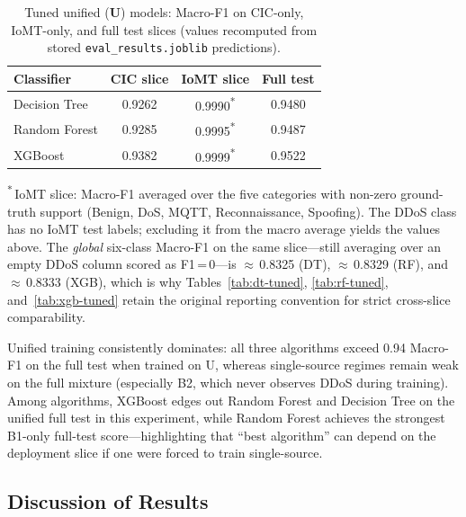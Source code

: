\begin{table}[H]
\centering
\caption{Tuned unified (\textbf{U}) models: Macro-F1 on CIC-only, IoMT-only, and full test slices (values recomputed from stored \texttt{eval\_results.joblib} predictions).}
\label{tab:tuned-u-cross-slice-macrof1-present}
\small
\begin{tabular}{@{}l c c c@{}}
\toprule
\textbf{Classifier} & \textbf{CIC slice} & \textbf{IoMT slice} & \textbf{Full test} \\
\midrule
Decision Tree  & 0.9262 & 0.9990\textsuperscript{*} & 0.9480 \\
Random Forest  & 0.9285 & 0.9995\textsuperscript{*} & 0.9487 \\
XGBoost        & 0.9382 & 0.9999\textsuperscript{*} & 0.9522 \\
\bottomrule
\end{tabular}

\vspace{0.35em}
\raggedright\footnotesize
\textsuperscript{*}\,IoMT slice: Macro-F1 averaged over the five categories with non-zero ground-truth support (Benign, DoS, MQTT, Reconnaissance, Spoofing). The DDoS class has no IoMT test labels; excluding it from the macro average yields the values above. The \emph{global} six-class Macro-F1 on the same slice---still averaging over an empty DDoS column scored as F1\,=\,0---is $\approx$\,0.8325 (DT), $\approx$\,0.8329 (RF), and $\approx$\,0.8333 (XGB), which is why Tables~\ref{tab:dt-tuned}, \ref{tab:rf-tuned}, and~\ref{tab:xgb-tuned} retain the original reporting convention for strict cross-slice comparability.
\end{table}

Unified training consistently dominates: all three algorithms exceed 0.94 Macro-F1 on the full test when trained on U, whereas single-source regimes remain weak on the full mixture (especially B2, which never observes DDoS during training). Among algorithms, XGBoost edges out Random Forest and Decision Tree on the unified full test in this experiment, while Random Forest achieves the strongest B1-only full-test score---highlighting that ``best algorithm'' can depend on the deployment slice if one were forced to train single-source.

\subsection{Discussion of Results}
\label{subsec:discussion}


